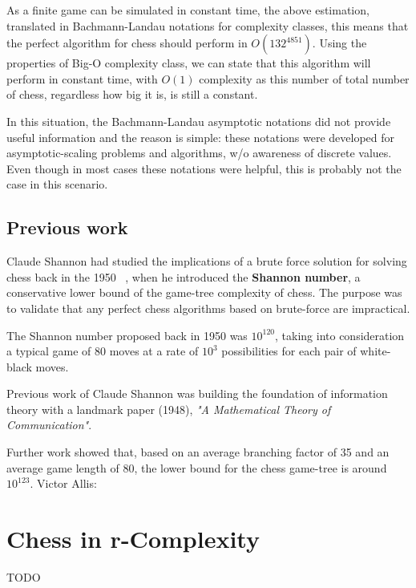 As a finite game can be simulated in constant time, the above estimation, translated in Bachmann-Landau notations for complexity classes, this means that the perfect algorithm for chess should perform in $O(132^{4851})$. Using the properties of Big-O complexity class, we can state that this algorithm will perform in constant time, with $O(1)$ complexity as this number of total number of chess, regardless how big it is, is still a constant. 

In this situation, the Bachmann-Landau asymptotic notations did not provide useful information and the reason is simple: these notations were developed for asymptotic-scaling problems and algorithms, w/o awareness of discrete values. Even though in most cases these notations were helpful, this is probably not the case in this scenario.

\subsection{Previous work}
Claude Shannon had studied the implications of a brute force solution for solving chess back in the 1950 ~\cite{shannon1950xxii}, when he introduced the \textbf{Shannon number}, a conservative lower bound of the game-tree complexity of chess. The purpose was to validate that any perfect chess algorithms based on brute-force are impractical.

The Shannon number proposed back in 1950 was $10^{120}$, taking into consideration a typical game  of 80 moves at a rate of $10^3$ possibilities for each pair of white-black moves.

Previous work of Claude Shannon was building the foundation of information theory with a landmark paper (1948), \textit{"A Mathematical Theory of Communication"}. 

Further work showed that, based on an average branching factor of 35 and an average game length of 80, the lower bound for the chess game-tree is around $10^{123}$. Victor Allis: ~\cite{allis1994searching}

\section{Chess in r-Complexity}
TODO
